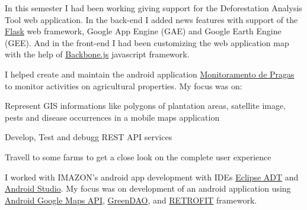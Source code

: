 \documentclass[]{joaosoares-resume}
\begin{document}
\begin{minipage}[t]{0.64\textwidth}
\sectionsep

{\justifying \noindent In this semester I had been working giving support for the Deforestation Analysis Tool web application. In the back-end I added news features with support of the \href{http://flask.pocoo.org}{Flask} web framework, Google App Engine (GAE) and Google Earth Engine (GEE). And in the front-end I had been customizing the web application map with the help of \href{https://backbonejs.org}{Backbone.js} javascript framework.\par}

\sectionsep

\sectionsep
{\justifying \noindent I helped create and maintain the android application \href{https://play.google.com/store/apps/details?id=br.agr.terras.monitoramentopragas}{Monitoramento de Pragas} to monitor activities on agricultural properties. My focus was on:\par}
\sectionsep
\begin{tightemize}
\item Represent GIS informations like polygons of plantation areas, satellite image, pests and disease occurrences in a mobile maps application
\item Develop, Test and debugg REST API services
\item Travell to some farms to get a close look on the complete user experience
\end{tightemize}
\sectionsep

\sectionsep 

{\justifying \noindent I worked with IMAZON’s android app development with IDEs \href{https://developer.android.com/studio/tools/sdk/eclipse-adt.html}{Eclipse ADT} and \href{https://developer.android.com/studio/}{Android Studio}. My focus was on development of an android application using \href{https://developers.google.com/maps/documentation/android-api}{Android Google Maps API}, \href{http://greenrobot.org/greendao}{GreenDAO}, and \href{https://square.github.io/retrofit}{RETROFIT} framework.\par}


\end{minipage}
\end{document}
